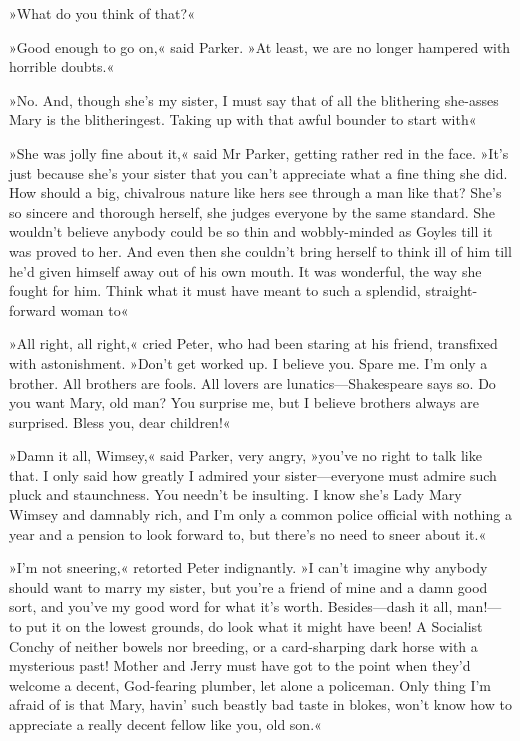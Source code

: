 »What do you think of that?«

»Good enough to go on,« said Parker. »At least, we are no longer hampered with horrible doubts.«

»No. And, though she's my sister, I must say that of all the blithering she-asses Mary is the blitheringest. Taking up with that awful bounder to start with\longdash«

»She was jolly fine about it,« said Mr Parker, getting rather red in the face. »It's just because she's your sister that you can't appreciate what a fine thing she did. How should a big, chivalrous nature like hers see through a man like that? She's so sincere and thorough herself, she judges everyone by the same standard. She wouldn't believe anybody could be so thin and wobbly-minded as Goyles till it was proved to her. And even then she couldn't bring herself to think ill of him till he'd given himself away out of his own mouth. It was wonderful, the way she fought for him. Think what it must have meant to such a splendid, straight-forward woman to\longdash«

»All right, all right,« cried Peter, who had been staring at his friend, transfixed with astonishment. »Don't get worked up. I believe you. Spare me. I'm only a brother. All brothers are fools. All lovers are lunatics—Shakespeare says so. Do you want Mary, old man? You surprise me, but I believe brothers always are surprised. Bless you, dear children!«

»Damn it all, Wimsey,« said Parker, very angry, »you've no right to talk like that. I only said how greatly I admired your sister—everyone must admire such pluck and staunchness. You needn't be insulting. I know she's Lady Mary Wimsey and damnably rich, and I'm only a common police official with nothing a year and a pension to look forward to, but there's no need to sneer about it.«

»I'm not sneering,« retorted Peter indignantly. »I can't imagine why anybody should want to marry my sister, but you're a friend of mine and a damn good sort, and you've my good word for what it's worth. Besides—dash it all, man!—to put it on the lowest grounds, do look what it might have been! A Socialist Conchy of neither bowels nor breeding, or a card-sharping dark horse with a mysterious past! Mother and Jerry must have got to the point when they'd welcome a decent, God-fearing plumber, let alone a policeman. Only thing I'm afraid of is that Mary, havin' such beastly bad taste in blokes, won't know how to appreciate a really decent fellow like you, old son.«

